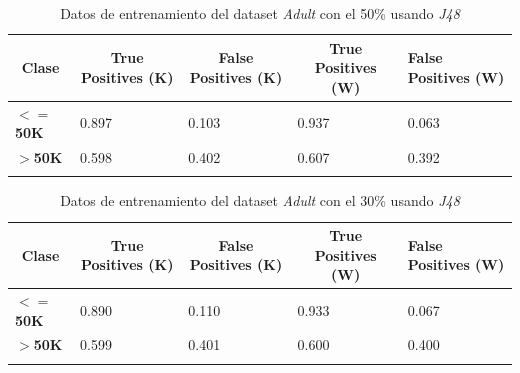 \documentclass[10pt,a4paper]{article}
\begin{document}
\begin{table}[h]
\begin{tabular}{lllll}
\hline
\multicolumn{1}{|c|}{\textbf{Clase}} & \multicolumn{1}{c|}{\textbf{True Positives (K)}} & \multicolumn{1}{c|}{\textbf{False Positives (K)}} & \multicolumn{1}{c|}{\textbf{True Positives (W)}} & \multicolumn{1}{l|}{\textbf{False Positives (W)}} \\ \hline
\multicolumn{1}{|l|}{\textbf{$<=$50K}} & \multicolumn{1}{l|}{0.897}          & \multicolumn{1}{l|}{0.103}          & \multicolumn{1}{l|}{0.937}          & \multicolumn{1}{l|}{0.063} \\ \hline
\multicolumn{1}{|l|}{\textbf{$>$50K}} & \multicolumn{1}{l|}{0.598}          & \multicolumn{1}{l|}{0.402}          & \multicolumn{1}{l|}{0.607}          & \multicolumn{1}{l|}{0.392} \\ \hline
\textbf{}                       &                                &                                &                                &                      
\end{tabular}
\caption{Datos de entrenamiento del dataset \emph{Adult} con el 50\% usando \emph{J48}}
\label{tab:adult_j48_50}
\end{table}

\begin{table}[h]
\begin{tabular}{lllll}
\hline
\multicolumn{1}{|c|}{\textbf{Clase}} & \multicolumn{1}{c|}{\textbf{True Positives (K)}} & \multicolumn{1}{c|}{\textbf{False Positives (K)}} & \multicolumn{1}{c|}{\textbf{True Positives (W)}} & \multicolumn{1}{l|}{\textbf{False Positives (W)}} \\ \hline
\multicolumn{1}{|l|}{\textbf{$<=$50K}} & \multicolumn{1}{l|}{0.890}          & \multicolumn{1}{l|}{0.110}          & \multicolumn{1}{l|}{0.933}          & \multicolumn{1}{l|}{0.067} \\ \hline
\multicolumn{1}{|l|}{\textbf{$>$50K}} & \multicolumn{1}{l|}{0.599}          & \multicolumn{1}{l|}{0.401}          & \multicolumn{1}{l|}{0.600}          & \multicolumn{1}{l|}{0.400} \\ \hline
\textbf{}                       &                                &                                &                                &                      
\end{tabular}
\caption{Datos de entrenamiento del dataset \emph{Adult} con el 30\% usando \emph{J48}}
\label{tab:adult_j48_30}
\end{table}

\newpage
\end{document}

